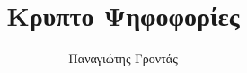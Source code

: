 \documentclass[handout]{beamer}
\title{Κρυπτο Ψηφοφορίες}
\author{Παναγιώτης Γροντάς}
\date{}
\institute{ΕΜΠ - Κρυπτογραφία - (2016-2017)}
\begin{document}
\newcommand{\xor}{ \oplus }
\newcommand{\MSG}{ \mathtt{M} }
\newcommand{\KEY}{ \mathtt{K} }
\newcommand{\CPH}{ \mathtt{C} }
\newcommand{\keygen}{\mathtt{KeyGen}}
\newcommand{\enc}{\mathtt{Encrypt}}
\newcommand{\dec}{\mathtt{Decrypt}}
\newcommand{\adv}{$\mathcal{A} \,$ }
\newcommand{\advb}{$\mathcal{B} \,$ }
\newcommand{\chal}{$\mathcal{C} \,$ }
\newcommand{\cs}{$\mathcal{CS} \,$ }
\newcommand{\zns}{  \mathbb{Z}^*_n }
\newcommand{\zs}[1]{  \mathbb{Z}^*_{#1} }

\newcommand{\green}[1]{\textcolor{teal}{#1}}
\newcommand{\Green}[1]{\textcolor{Teal}{#1}}
\newcommand{\ForestGreen}[1]{\textcolor{ForestGreen}{#1}}
\newcommand{\blue}[1]{\textcolor{blue}{#1}}
\newcommand{\magenta}[1]{\textcolor{magenta}{#1}}
\newcommand{\cyan}[1]{\textcolor{cyan}{#1}}

\newcommand{\twopartdef}[4]
{ 
		\begin{cases}
			#1 , #2 \\
			#3 , #4
		\end{cases} 
}
\begin{frame}
\titlepage
\end{frame}


\npthousandsep{ }
\end{document}
